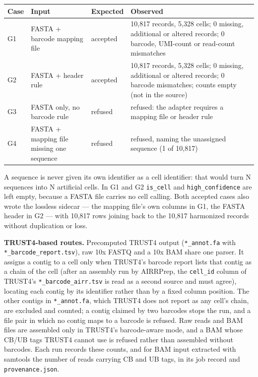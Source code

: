 \documentclass[11pt]{article}
\begin{document}
\begin{center}
\small
\begin{tabular}{p{}p{}p{}p{}}
\toprule
\textbf{Case} & \textbf{Input} & \textbf{Expected} & \textbf{Observed} \\
\midrule
G1 & FASTA + barcode mapping file & accepted & 10,817 records, 5,328 cells; 0 missing, additional or altered records; 0 barcode, UMI-count or read-count mismatches \\
G2 & FASTA + header rule & accepted & 10,817 records, 5,328 cells; 0 missing, additional or altered records; 0 barcode mismatches; counts empty (not in the source) \\
G3 & FASTA only, no barcode rule & refused & refused: the adapter requires a mapping file or header rule \\
G4 & FASTA + mapping file missing one sequence & refused & refused, naming the unassigned sequence (1 of 10,817) \\
\bottomrule
\end{tabular}
\end{center}

A sequence is never given its own identifier as a cell identifier: that would
turn N sequences into N artificial cells. In G1 and G2 \texttt{is\_cell} and
\texttt{high\_confidence} are left empty, because a FASTA file carries no cell
calling. Both accepted cases also wrote the lossless sidecar --- the mapping
file's own columns in G1, the FASTA header in G2 --- with 10,817 rows joining
back to the 10,817 harmonized records without duplication or loss.

\textbf{TRUST4-based routes.} Precomputed TRUST4 output (\texttt{*\_annot.fa}
with \texttt{*\_barcode\_report.tsv}), raw 10x FASTQ and a 10x BAM share one
parser. It assigns a contig to a cell only when TRUST4's barcode report lists
that contig as a chain of the cell (after an assembly run by AIRRPrep, the
\texttt{cell\_id} column of TRUST4's \texttt{*\_barcode\_airr.tsv} is read as a
second source and must agree), locating each contig by its identifier rather
than by a fixed column position. The other contigs in \texttt{*\_annot.fa},
which TRUST4 does not report as any cell's chain, are excluded and counted; a
contig claimed by two barcodes stops the run, and a file pair in which no
contig maps to a barcode is refused. Raw reads and BAM files are assembled only
in TRUST4's barcode-aware mode, and a BAM whose CB/UB tags TRUST4 cannot use is
refused rather than assembled without barcodes. Each run records these counts,
and for BAM input extracted with samtools the number of reads carrying CB and
UB tags, in its job record and \texttt{provenance.json}.
\end{document}
